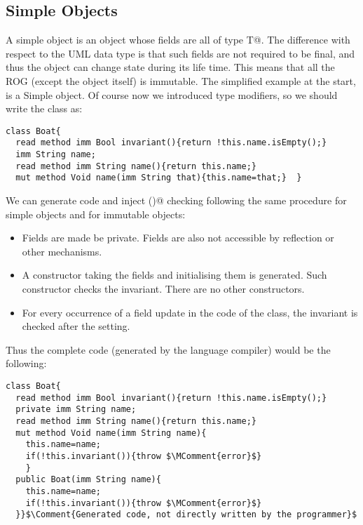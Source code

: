 \saveSpace
\subsection{Simple Objects}
\label{s:simple}
\saveSpace
A simple object is an object whose fields are all of type \Q@imm T@.
The difference with respect to the UML data type is that such fields are not required to be final, and thus the object can change state during its life time.
This means that all the ROG (except the object itself) is
immutable.
The simplified \Q@Boat@ example at the start, is a Simple object.
Of course now we introduced type modifiers, so we should write the \Q@Boat@ class as:

\begin{lstlisting}
class Boat{
  read method imm Bool invariant(){return !this.name.isEmpty();}  
  imm String name;
  read method imm String name(){return this.name;}
  mut method Void name(imm String that){this.name=that;}  }
\end{lstlisting}

We can generate code and inject \Q@invariant()@ checking
following the same procedure for simple objects and
for immutable objects:
\begin{itemize}
\item Fields are made be private.
Fields are also not accessible by reflection or other mechanisms.
\item A constructor taking the fields and initialising them is generated.
Such constructor checks the invariant.
There are no other constructors.%
\item For every occurrence of a field update
in the code of the class, the invariant is checked after the setting.
\end{itemize}
Thus the complete code (generated by the language compiler) would be the following:

\begin{lstlisting}
class Boat{
  read method imm Bool invariant(){return !this.name.isEmpty();}
  private imm String name;
  read method imm String name(){return this.name;}
  mut method Void name(imm String name){
    this.name=name;
    if(!this.invariant()){throw $\MComment{error}$}
    }
  public Boat(imm String name){
    this.name=name;
    if(!this.invariant()){throw $\MComment{error}$}
  }}$\Comment{Generated code, not directly written by the programmer}$
\end{lstlisting}



